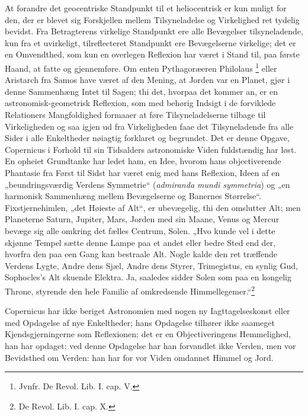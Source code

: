 \documentclass[12pt,a4paper]{book}
\renewcommand{\thefootnote}{*)}
\begin{document}
At forandre det geocentriske Standpunkt til et heliocentrisk er kun
muligt for den, der er blevet sig Forskjellen mellem Tilsyneladelse og
Virkelighed ret tydelig bevidst. Fra Betragterens virkelige Standpunkt
ere alle Bevægelser tilsyneladende, kun fra et uvirkeligt,
tilreflecteret Standpunkt ere Bevægelserne virkelige; det er en
Omvendthed, som kun en overlegen Reflexion har været i Stand til, paa
første Haand, at fatte og gjennemføre. Om enten Pythagoræeren
Philolaus%
\renewcommand{\thefootnote}{**)}%
\footnote{%
Jvnfr. De Revol. Lib. I. cap. V.}%
\renewcommand{\thefootnote}{*)}
eller Aristarch fra Samos have været af den Mening, at Jorden var en
Planet, gjør i denne Sammenhæng Intet til Sagen; thi det, hvorpaa det
kommer an, er en astronomisk-geometrisk Reflexion, som med behørig
Indsigt i
de forviklede Relationers Mangfoldighed formaaer at føre
Tilsyneladelserne tilbage til Virkeligheden og saa igjen ud fra
Virkeligheden faae det Tilsyneladende fra alle Sider i alle
Enkeltheder nøiagtig forklaret og begrundet. Det er denne Opgave,
Copernicus i Forhold til sin Tidsalders astronomiske Viden fuldstændig
har løst. En opheiet Grundtanke har ledet ham, en Idee, hvorom hans
objectiverende Phantasie fra Først til Sidst har været enig med hans
Reflexion, Ideen af en „beundringsværdig Verdens Symmetrie“
(\textit{admiranda mundi symmetria}) og „en harmonisk Sammenhæng mellem
Bevægelserne og Banernes Størrelse“. Fixstjernehimlen, „det Høieste af
Alt“, er ubevægelig, thi den omslutter Alt; men Planeterne Saturn,
Jupiter, Mars, Jorden med sin Maane, Venus og Mercur bevæge sig alle
omkring det fælles Centrum, Solen. „Hvo kunde vel i dette skjønne
Tempel sætte denne Lampe paa et andet eller bedre Sted end der, hvorfra
den paa een Gang kan bestraale Alt. Nogle kalde den ret træffende
Verdens Lygte, Andre dens Sjæl, Andre dens Styrer, Trimegistus, en
synlig Gud, Sophocles's Alt skuende Elektra. Ja, saaledes sidder Solen
som paa en kongelig Throne, styrende den hele Familie af omkredsende
Himmellegemer.“\footnote{%
De Revol. Lib. I. cap. X.}

Copernicus har ikke beriget Astronomien med nogen ny
Iagttagelseskonst eller med Opdagelse af nye Enkeltheder; hans
Opdagelse tilhører ikke saameget Kjendsgjerningerne som Reflexionen;
det er en Objectiveringens Hemmelighed, han har opdaget; ved denne
Opdagelse har han forvandlet ikke Verden, men vor Bevidsthed om
Verden: han har for vor Viden omdannet Himmel og Jord.
\end{document}
